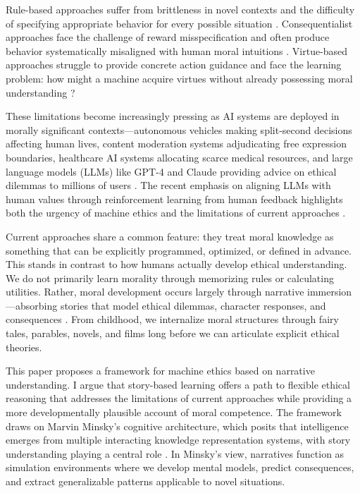 \documentclass[12pt]{article}
\begin{document}
Rule-based approaches suffer from brittleness in novel contexts and the difficulty of specifying appropriate behavior for every possible situation \citep{bryson2018patiency, dennis2016formal}. Consequentialist approaches face the challenge of reward misspecification and often produce behavior systematically misaligned with human moral intuitions \citep{bostrom2014superintelligence, amodei2016concrete}. Virtue-based approaches struggle to provide concrete action guidance and face the learning problem: how might a machine acquire virtues without already possessing moral understanding \citep{wallach2008moral}?

These limitations become increasingly pressing as AI systems are deployed in morally significant contexts---autonomous vehicles making split-second decisions affecting human lives, content moderation systems adjudicating free expression boundaries, healthcare AI systems allocating scarce medical resources, and large language models (LLMs) like GPT-4 and Claude providing advice on ethical dilemmas to millions of users \citep{brown2020language, openai2023gpt4}. The recent emphasis on aligning LLMs with human values through reinforcement learning from human feedback highlights both the urgency of machine ethics and the limitations of current approaches \citep{christiano2017deep, bai2022constitutional, ouyang2022training}.

Current approaches share a common feature: they treat moral knowledge as something that can be explicitly programmed, optimized, or defined in advance. This stands in contrast to how humans actually develop ethical understanding. We do not primarily learn morality through memorizing rules or calculating utilities. Rather, moral development occurs largely through narrative immersion---absorbing stories that model ethical dilemmas, character responses, and consequences \citep{nussbaum1990love, johnson1993moral, bruner1991narrative}. From childhood, we internalize moral structures through fairy tales, parables, novels, and films long before we can articulate explicit ethical theories.

This paper proposes a framework for machine ethics based on narrative understanding. I argue that story-based learning offers a path to flexible ethical reasoning that addresses the limitations of current approaches while providing a more developmentally plausible account of moral competence. The framework draws on Marvin Minsky's cognitive architecture, which posits that intelligence emerges from multiple interacting knowledge representation systems, with story understanding playing a central role \citep{minsky1986society, minsky2006emotion}. In Minsky's view, narratives function as simulation environments where we develop mental models, predict consequences, and extract generalizable patterns applicable to novel situations.
\end{document}
